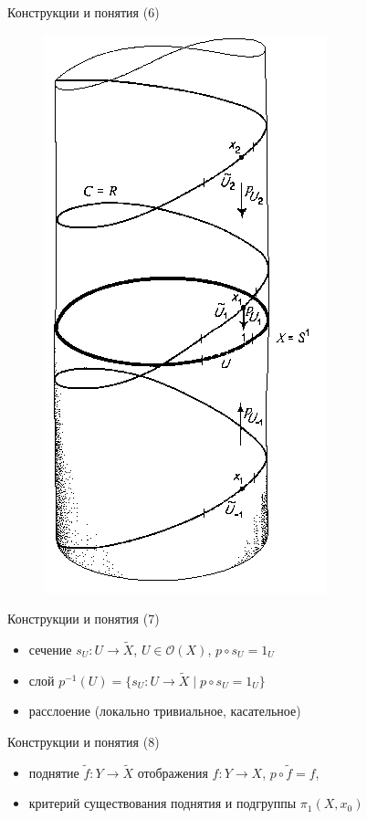 \documentclass{beamer}
\begin{document}
\begin{frame}{Конструкции и понятия (6)}
\begin{center}
	\begin{figure}[H]
		\includegraphics[scale=0.3]{covering1.png} 
	\end{figure}
\end{center}
\end{frame}


\begin{frame}{Конструкции и понятия (7)}
\begin{itemize}
	\item сечение $s_U : U \to \widetilde{X}$, $U \in \mathcal{O}(X)$, $p \circ s_U = 1_U$
    \item слой $p^{-1}(U) = \{ s_U : U \to \widetilde{X} \; \vert \; p \circ s_U = 1_U \}$
    \item расслоение (локально тривиальное, касательное)
\end{itemize}
\end{frame}

\begin{frame}{Конструкции и понятия (8)}
\begin{itemize}
	\item поднятие $\widetilde{f} : Y \to \widetilde{X}$ отображения $f : Y \to X$, $p \circ \widetilde{f} = f$, 
	\item критерий существования поднятия и подгруппы $\pi_1(X, x_0)$
\end{itemize}
\end{frame}
\end{document}
